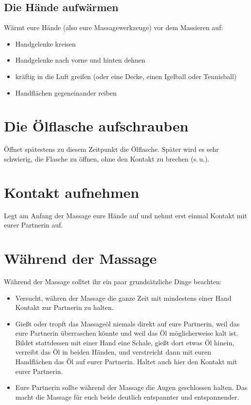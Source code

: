 \subsection{Die Hände aufwärmen}

Wärmt eure Hände (also eure Massagewerkzeuge) vor dem Massieren auf:

\begin{itemize}
  \item Handgelenke kreisen
  \item Handgelenke nach vorne und hinten dehnen
  \item kräftig in die Luft greifen (oder eine Decke, einen Igelball oder Tennisball)
  \item Handflächen gegeneinander reiben
\end{itemize}


\section{Die Ölflasche aufschrauben}

Öffnet spätestens zu diesem Zeitpunkt die Ölflasche. Später wird es sehr schwierig, die Flasche zu öffnen, ohne den Kontakt zu brechen (s.\,u.).

\section{Kontakt aufnehmen}

Legt am Anfang der Massage eure Hände auf und nehmt erst einmal Kontakt mit eurer Partnerin auf.


\section{Während der Massage}

Während der Massage solltet ihr ein paar grundsätzliche Dinge beachten:

\begin{itemize}
  \item Versucht, währen der Massage die ganze Zeit mit mindestens einer Hand Kontakt zur Partnerin zu halten.
  \item Gießt oder tropft das Massageöl niemals direkt auf eure Partnerin, weil das eure Partnerin überraschen könnte und weil das Öl möglicherweise kalt ist. Bildet stattdessen mit einer Hand eine Schale, gießt dort etwas Öl hinein, verreibt das Öl in beiden Händen, und verstreicht dann mit euren Handflächen das Öl auf eurer Partnerin. Haltet auch hier den Kontakt mit eurer Partnerin.
  \item Eure Partnerin sollte während der Massage die Augen geschlossen halten. Das macht die Massage für euch beide deutlich entspannter und entspannender.
\end{itemize}


